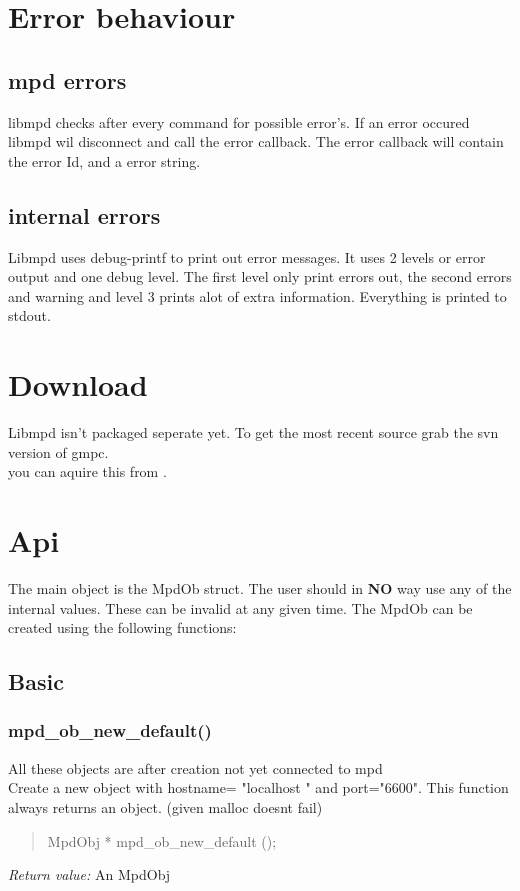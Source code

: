 \documentclass[a4paper,11pt]{article}
\newcommand{\tmstrong}[1]{\textbf{#1}}
\begin{document}
	
	\section{Error behaviour}
	\subsection{mpd errors}
	libmpd checks after every command for possible error's. If an error occured
	libmpd wil disconnect and call the error callback. The error callback will
	contain the error Id, and a error string.
	\subsection {internal errors}
	Libmpd uses debug-printf to print out error messages. It uses 2 levels or error output and one debug level.
	The first level only print errors out, the second errors and warning and level 3 prints alot of extra information.
	Everything is printed to stdout.
	
	\section{Download}
	Libmpd isn't packaged seperate yet. To get the most recent source grab the svn version of gmpc.\\
	you can aquire this from .\\
	
	
	\section{Api}
	The main object is the MpdOb struct. The user should in {\tmstrong{NO}} way
	use any of the internal values. These can be invalid at any given time. The
	MpdOb can be created using the following functions:
	
	\subsection{Basic}
	\subsubsection{mpd\_ob\_new\_default()}
	All these objects are after creation not yet connected to mpd\\
	Create a new object with hostname= "localhost " and port="6600". This function always returns an object. (given malloc doesnt fail)
	\begin{quote}
	MpdObj * mpd\_ob\_new\_default (); 
	\end{quote}
	\textit{Return value:} An MpdObj
	
\end{document}
